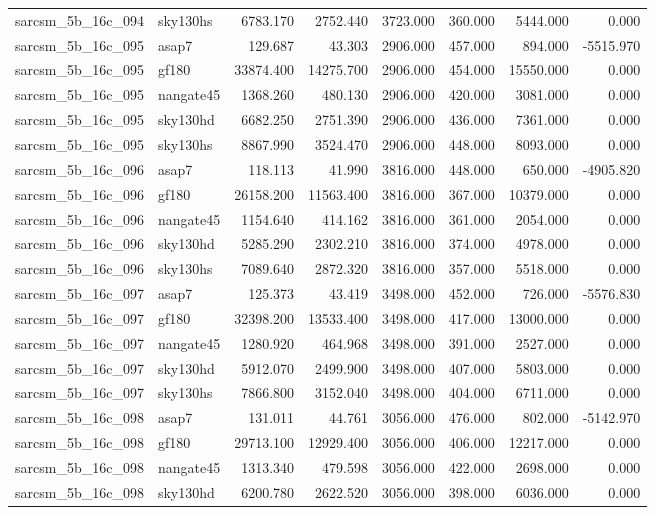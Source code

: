 \begin{tabular}{llrrrrrr}
sarcsm\_5b\_16c\_094 & sky130hs & 6783.170 & 2752.440 & 3723.000 & 360.000 & 5444.000 & 0.000 \\
sarcsm\_5b\_16c\_095 & asap7 & 129.687 & 43.303 & 2906.000 & 457.000 & 894.000 & -5515.970 \\
sarcsm\_5b\_16c\_095 & gf180 & 33874.400 & 14275.700 & 2906.000 & 454.000 & 15550.000 & 0.000 \\
sarcsm\_5b\_16c\_095 & nangate45 & 1368.260 & 480.130 & 2906.000 & 420.000 & 3081.000 & 0.000 \\
sarcsm\_5b\_16c\_095 & sky130hd & 6682.250 & 2751.390 & 2906.000 & 436.000 & 7361.000 & 0.000 \\
sarcsm\_5b\_16c\_095 & sky130hs & 8867.990 & 3524.470 & 2906.000 & 448.000 & 8093.000 & 0.000 \\
sarcsm\_5b\_16c\_096 & asap7 & 118.113 & 41.990 & 3816.000 & 448.000 & 650.000 & -4905.820 \\
sarcsm\_5b\_16c\_096 & gf180 & 26158.200 & 11563.400 & 3816.000 & 367.000 & 10379.000 & 0.000 \\
sarcsm\_5b\_16c\_096 & nangate45 & 1154.640 & 414.162 & 3816.000 & 361.000 & 2054.000 & 0.000 \\
sarcsm\_5b\_16c\_096 & sky130hd & 5285.290 & 2302.210 & 3816.000 & 374.000 & 4978.000 & 0.000 \\
sarcsm\_5b\_16c\_096 & sky130hs & 7089.640 & 2872.320 & 3816.000 & 357.000 & 5518.000 & 0.000 \\
sarcsm\_5b\_16c\_097 & asap7 & 125.373 & 43.419 & 3498.000 & 452.000 & 726.000 & -5576.830 \\
sarcsm\_5b\_16c\_097 & gf180 & 32398.200 & 13533.400 & 3498.000 & 417.000 & 13000.000 & 0.000 \\
sarcsm\_5b\_16c\_097 & nangate45 & 1280.920 & 464.968 & 3498.000 & 391.000 & 2527.000 & 0.000 \\
sarcsm\_5b\_16c\_097 & sky130hd & 5912.070 & 2499.900 & 3498.000 & 407.000 & 5803.000 & 0.000 \\
sarcsm\_5b\_16c\_097 & sky130hs & 7866.800 & 3152.040 & 3498.000 & 404.000 & 6711.000 & 0.000 \\
sarcsm\_5b\_16c\_098 & asap7 & 131.011 & 44.761 & 3056.000 & 476.000 & 802.000 & -5142.970 \\
sarcsm\_5b\_16c\_098 & gf180 & 29713.100 & 12929.400 & 3056.000 & 406.000 & 12217.000 & 0.000 \\
sarcsm\_5b\_16c\_098 & nangate45 & 1313.340 & 479.598 & 3056.000 & 422.000 & 2698.000 & 0.000 \\
sarcsm\_5b\_16c\_098 & sky130hd & 6200.780 & 2622.520 & 3056.000 & 398.000 & 6036.000 & 0.000 \\

\end{tabular}
